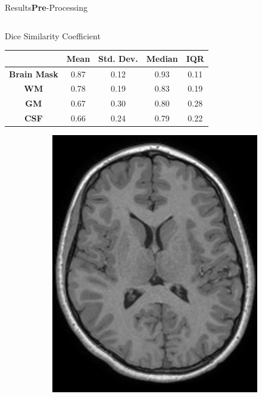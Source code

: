 \documentclass[]{standalone}
\begin{document}
\begin{frame}{Results}{\textbf{Pre}-Processing}
\begin{columns}
		\begin{column}{0.67\textwidth}
		\begin{block}{Dice Similarity Coefficient}
		\begin{table}[h!]
			\centering
			\small
			\setlength{\tabcolsep}{3pt}
			\begin{tabular}{c|cccc}
					    & \textbf{Mean} & \textbf{Std. Dev.} & \textbf{Median} & \textbf{IQR} \\ \hline
			\textbf{Brain Mask} & 0.87          & 0.12               & 0.93            & 0.11         \\
			\textbf{WM}         & 0.78          & 0.19               & 0.83            & 0.19         \\
			\textbf{GM}         & 0.67          & 0.30               & 0.80            & 0.28         \\
			\textbf{CSF}        & 0.66          & 0.24               & 0.79            & 0.22        
			\end{tabular}
			\end{table}
			\vspace{-10pt}
		\end{block}
			\vspace{-5pt}
			\begin{figure}[h!]
			\tiny
			\centering
				\begin{subfigure}{0.32\textwidth}
					\includegraphics[scale=0.11]{./IMG/T1W48.png}

\end{subfigure}
\end{figure}
\end{column}
\end{columns}
\end{frame}
\end{document}

